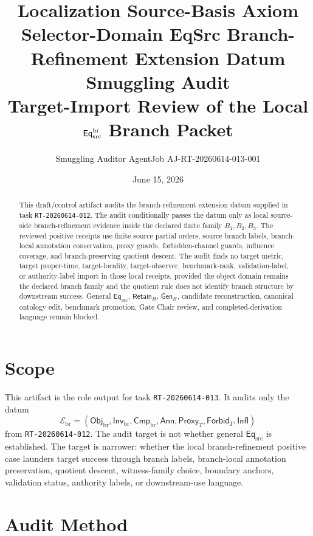 \documentclass[11pt]{article}
\title{\textbf{Localization Source-Basis Axiom Selector-Domain EqSrc Branch-Refinement Extension Datum Smuggling Audit}\\[0.35em]
\large Target-Import Review of the Local \(\mathsf{Eq}_{\mathrm{src}}^{\mathrm{br}}\) Branch Packet}
\author{Smuggling Auditor AgentJob AJ-RT-20260614-013-001}
\date{June 15, 2026}
\newcommand{\EqSrc}{\mathsf{Eq}_{\mathrm{src}}}
\newcommand{\ObjBr}{\mathsf{Obj}_{\mathrm{br}}}
\newcommand{\InvBr}{\mathsf{Inv}_{\mathrm{br}}}
\newcommand{\CmpBr}{\mathsf{Cmp}_{\mathrm{br}}}
\newcommand{\Ann}{\mathsf{Ann}}
\newcommand{\Proxy}{\mathsf{Proxy}_{T}}
\newcommand{\Forbid}{\mathsf{Forbid}_{T}}
\newcommand{\Infl}{\mathsf{Infl}}
\newcommand{\RetainH}{\mathsf{Retain}_{H}}
\newcommand{\GenH}{\mathsf{Gen}_{H}}
\begin{document}
\maketitle

\begin{abstract}
This draft/control artifact audits the branch-refinement extension datum
supplied in task \texttt{RT-20260614-012}. The audit conditionally passes
the datum only as local source-side branch-refinement evidence inside the
declared finite family \(B_{1},B_{2},B_{3}\). The reviewed positive
receipts use finite source partial orders, source branch labels,
branch-local annotation conservation, proxy guards, forbidden-channel
guards, influence coverage, and branch-preserving quotient descent. The
audit finds no target metric, target proper-time, target-locality,
target-observer, benchmark-rank, validation-label, or authority-label
import in those local receipts, provided the object domain remains the
declared branch family and the quotient rule does not identify branch
structure by downstream success. General \(\EqSrc\), \(\RetainH\),
\(\GenH\), candidate reconstruction, canonical ontology edit, benchmark
promotion, Gate Chair review, and completed-derivation language remain
blocked.
\end{abstract}

\section{Scope}

This artifact is the role output for task \texttt{RT-20260614-013}. It
audits only the datum
\[
    \mathcal{E}_{\mathrm{br}} =
    (\ObjBr,\InvBr,\CmpBr,\Ann,\Proxy,\Forbid,\Infl)
\]
from \texttt{RT-20260614-012}. The audit target is not whether general
\(\EqSrc\) is established. The target is narrower: whether the local
branch-refinement positive case launders target success through branch
labels, branch-local annotation preservation, quotient descent,
witness-family choice, boundary anchors, validation status, authority
labels, or downstream-use language.

\section{Audit Method}
\end{document}

